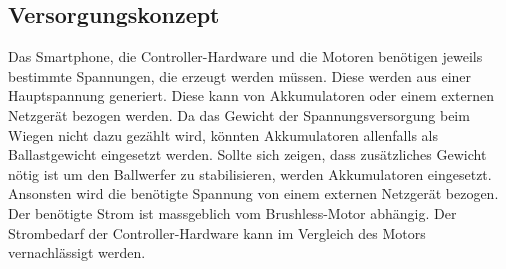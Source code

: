 \subsection{Versorgungskonzept}
	Das Smartphone, die Controller-Hardware und die Motoren benötigen jeweils bestimmte 
	Spannungen, die erzeugt werden müssen. Diese werden aus einer Hauptspannung generiert. 
	Diese kann von Akkumulatoren oder einem externen Netzgerät bezogen werden. Da das 
	Gewicht der Spannungsversorgung beim Wiegen nicht dazu gezählt wird, könnten Akkumulatoren 
	allenfalls als Ballastgewicht eingesetzt werden. Sollte sich zeigen, dass zusätzliches 
	Gewicht nötig ist um den Ballwerfer zu stabilisieren, werden Akkumulatoren eingesetzt. 
	Ansonsten wird die benötigte Spannung von einem externen Netzgerät bezogen. Der benötigte 
	Strom ist massgeblich vom Brushless-Motor abhängig. Der  Strombedarf der Controller-Hardware 
	kann im Vergleich des Motors vernachlässigt werden.
